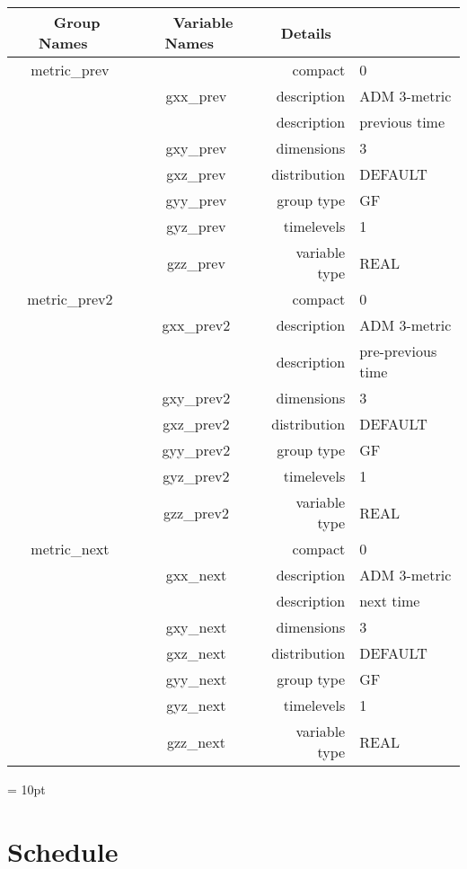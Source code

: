 \begin{tabular*}{150mm}{|c|c@{\extracolsep{\fill}}|rl|} \hline 
~ {\bf Group Names} ~ & ~ {\bf Variable Names} ~  &{\bf Details} ~ & ~\\ 
\hline 
metric\_prev &  & compact & 0 \\ 
 & gxx\_prev & description & ADM 3-metric \\ 
& ~ & description &  previous time \\ 
 & gxy\_prev & dimensions & 3 \\ 
 & gxz\_prev & distribution & DEFAULT \\ 
 & gyy\_prev & group type & GF \\ 
 & gyz\_prev & timelevels & 1 \\ 
 & gzz\_prev & variable type & REAL \\ 
\hline 
metric\_prev2 &  & compact & 0 \\ 
 & gxx\_prev2 & description & ADM 3-metric \\ 
& ~ & description &  pre-previous time \\ 
 & gxy\_prev2 & dimensions & 3 \\ 
 & gxz\_prev2 & distribution & DEFAULT \\ 
 & gyy\_prev2 & group type & GF \\ 
 & gyz\_prev2 & timelevels & 1 \\ 
 & gzz\_prev2 & variable type & REAL \\ 
\hline 
metric\_next &  & compact & 0 \\ 
 & gxx\_next & description & ADM 3-metric \\ 
& ~ & description &  next time \\ 
 & gxy\_next & dimensions & 3 \\ 
 & gxz\_next & distribution & DEFAULT \\ 
 & gyy\_next & group type & GF \\ 
 & gyz\_next & timelevels & 1 \\ 
 & gzz\_next & variable type & REAL \\ 
\hline 
\end{tabular*} 



\vspace{5mm}\parskip = 10pt 

\section{Schedule} 



